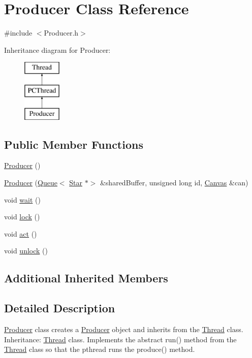 \hypertarget{class_producer}{}\section{Producer Class Reference}
\label{class_producer}


{\ttfamily \#include $<$Producer.\+h$>$}

Inheritance diagram for Producer\+:\begin{figure}[H]
\begin{center}
\leavevmode
\includegraphics[height=3.000000cm]{class_producer}
\end{center}
\end{figure}
\subsection*{Public Member Functions}
\begin{DoxyCompactItemize}
\item 
\hyperlink{class_producer_ab79ff8b19e682d144e40044485cb81b8}{Producer} ()
\item 
\hyperlink{class_producer_abfb6f8afcc08bdd27e6451c8ae5b0129}{Producer} (\hyperlink{class_queue}{Queue}$<$ \hyperlink{classtsgl_1_1_star}{Star} $\ast$$>$ \&shared\+Buffer, unsigned long id, \hyperlink{classtsgl_1_1_canvas}{Canvas} \&can)
\item 
void \hyperlink{class_producer_ac669b046bc8254d43b7ccc4e3e7a1a8b}{wait} ()
\item 
void \hyperlink{class_producer_aba582d5889728f3d4eb6399a5788ab9f}{lock} ()
\item 
void \hyperlink{class_producer_a40820fecb39439fac7a4f7b4227d4d1d}{act} ()
\item 
void \hyperlink{class_producer_a9a3ce835478573c67a6c8d928ccbf8f0}{unlock} ()
\end{DoxyCompactItemize}
\subsection*{Additional Inherited Members}


\subsection{Detailed Description}
\hyperlink{class_producer}{Producer} class creates a \hyperlink{class_producer}{Producer} object and inherits from the \hyperlink{class_thread}{Thread} class. Inheritance\+: \hyperlink{class_thread}{Thread} class. Implements the abstract run() method from the \hyperlink{class_thread}{Thread} class so that the pthread runs the produce() method. 

